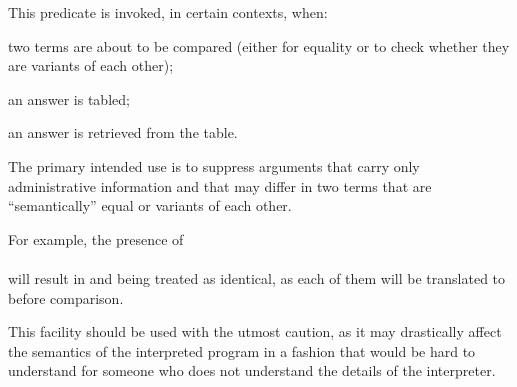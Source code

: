 This predicate is invoked, in certain contexts, when:
\begin{LightItemize}
  \item
    two terms are about to be compared (either for equality or to check
    whether they are variants of each other);
  \item
    an answer is tabled;
  \item
    an answer is retrieved from the table.
\end{LightItemize}

The primary intended use is to suppress arguments that carry only
administrative information and that may differ in two terms that are
``semantically'' equal or variants of each other.

For example, the presence of\\
\ind{}\\

will result in  and  being treated as
identical, as each of them will be translated to  before
comparison.

\begin{Warning}
This facility should be used with the utmost caution, as it may drastically
affect the semantics of the interpreted program in a fashion that would be
hard to understand for someone who does not understand the details of the
interpreter.
\end{Warning}
